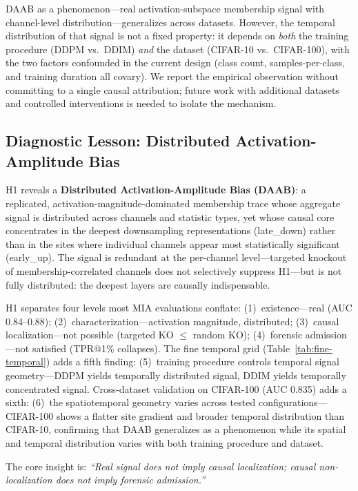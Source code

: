 \documentclass[10pt,conference]{IEEEtran}
\begin{document}
DAAB as a phenomenon---real activation-subspace membership signal
with channel-level distribution---generalizes across datasets. However, the
temporal distribution of that signal is not a fixed property: it depends on
\emph{both} the training procedure (DDPM vs.\ DDIM) \emph{and} the dataset
(CIFAR-10 vs.\ CIFAR-100), with the two factors confounded in the current
design (class count, samples-per-class, and training duration all covary).
We report the empirical observation without committing to a single causal
attribution; future work with additional datasets and controlled interventions
is needed to isolate the mechanism.

\subsection{Diagnostic Lesson: Distributed Activation-Amplitude Bias}

H1 reveals a \textbf{Distributed Activation-Amplitude Bias (DAAB)}:
a replicated, activation-magnitude-dominated membership trace whose
aggregate signal is distributed across channels and statistic types,
yet whose causal core concentrates in the deepest downsampling
representations (late\_down) rather than in the sites where individual
channels appear most statistically significant (early\_up). The signal
is redundant at the per-channel level---targeted knockout of
membership-correlated channels does not selectively suppress
H1---but is not fully distributed: the deepest layers are causally
indispensable.

H1 separates four levels most MIA evaluations conflate:
(1)~existence---real (AUC 0.84--0.88);
(2)~characterization---activation magnitude, distributed;
(3)~causal localization---not possible (targeted KO $\leq$ random KO);
(4)~forensic admission---not satisfied (TPR@1\% collapses).
The fine temporal grid (Table~\ref{tab:fine-temporal}) adds a fifth finding:
(5)~training procedure controls temporal signal geometry---DDPM yields
temporally distributed signal, DDIM yields temporally concentrated signal.
Cross-dataset validation on CIFAR-100 (AUC 0.835) adds a sixth:
(6)~the spatiotemporal geometry varies across tested configurations---CIFAR-100 shows
a flatter site gradient and broader temporal distribution than CIFAR-10,
confirming that DAAB generalizes as a phenomenon while its spatial and
temporal distribution varies with both training procedure and dataset.

The core insight is: \textit{``Real signal does not imply causal
localization; causal non-localization does not imply forensic admission.''}
\end{document}

